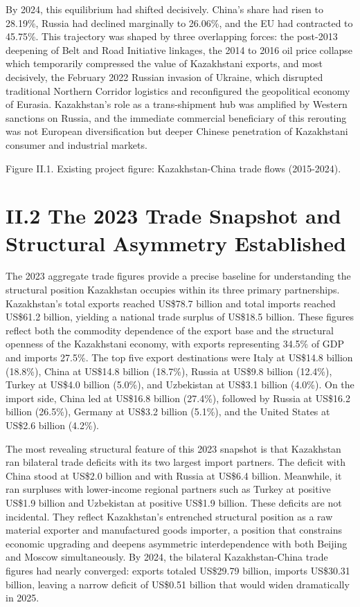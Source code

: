 \documentclass[12pt]{article}
\begin{document}
By 2024, this equilibrium had shifted decisively. China's share had risen to 28.19\%, Russia had declined marginally to 26.06\%, and the EU had contracted to 45.75\%. This trajectory was shaped by three overlapping forces: the post-2013 deepening of Belt and Road Initiative linkages, the 2014 to 2016 oil price collapse which temporarily compressed the value of Kazakhstani exports, and most decisively, the February 2022 Russian invasion of Ukraine, which disrupted traditional Northern Corridor logistics and reconfigured the geopolitical economy of Eurasia. Kazakhstan's role as a trans-shipment hub was amplified by Western sanctions on Russia, and the immediate commercial beneficiary of this rerouting was not European diversification but deeper Chinese penetration of Kazakhstani consumer and industrial markets.\par


Figure II.1. Existing project figure: Kazakhstan-China trade flows (2015-2024).\par

\section{II.2 The 2023 Trade Snapshot and Structural Asymmetry Established}

The 2023 aggregate trade figures provide a precise baseline for understanding the structural position Kazakhstan occupies within its three primary partnerships. Kazakhstan's total exports reached US\$78.7 billion and total imports reached US\$61.2 billion, yielding a national trade surplus of US\$18.5 billion. These figures reflect both the commodity dependence of the export base and the structural openness of the Kazakhstani economy, with exports representing 34.5\% of GDP and imports 27.5\%. The top five export destinations were Italy at US\$14.8 billion (18.8\%), China at US\$14.8 billion (18.7\%), Russia at US\$9.8 billion (12.4\%), Turkey at US\$4.0 billion (5.0\%), and Uzbekistan at US\$3.1 billion (4.0\%). On the import side, China led at US\$16.8 billion (27.4\%), followed by Russia at US\$16.2 billion (26.5\%), Germany at US\$3.2 billion (5.1\%), and the United States at US\$2.6 billion (4.2\%).\par

The most revealing structural feature of this 2023 snapshot is that Kazakhstan ran bilateral trade deficits with its two largest import partners. The deficit with China stood at US\$2.0 billion and with Russia at US\$6.4 billion. Meanwhile, it ran surpluses with lower-income regional partners such as Turkey at positive US\$1.9 billion and Uzbekistan at positive US\$1.9 billion. These deficits are not incidental. They reflect Kazakhstan's entrenched structural position as a raw material exporter and manufactured goods importer, a position that constrains economic upgrading and deepens asymmetric interdependence with both Beijing and Moscow simultaneously. By 2024, the bilateral Kazakhstan-China trade figures had nearly converged: exports totaled US\$29.79 billion, imports US\$30.31 billion, leaving a narrow deficit of US\$0.51 billion that would widen dramatically in 2025.\par
\end{document}
